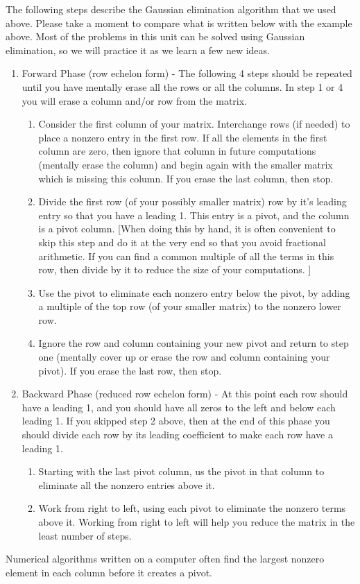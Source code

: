 \documentclass[10pt]{article}
\begin{document}
The following steps describe the Gaussian elimination algorithm that we used above. Please take a moment to compare what is written below with the example above. Most of the problems in this unit can be solved using Gaussian elimination, so we will practice it as we learn a few new ideas.
\begin{enumerate}
\item Forward Phase (row echelon form) - The following 4 steps should be repeated until you have mentally erase all the rows or all the columns. In step 1 or 4 you will erase a column and/or row from the matrix.
\begin{enumerate}
	\item  Consider the first column of your matrix. Interchange rows (if needed) to place a nonzero entry in the first row. If all the elements in the first column are zero, then ignore that column in future computations (mentally erase the column) and begin again with the smaller matrix which is missing this column. If you erase the last column, then stop.
  \item Divide the first row (of your possibly smaller matrix) row by it's leading entry so that you have a leading 1. This entry is a pivot, and the column is a pivot column. [When doing this by hand, it is often convenient to skip this step and do it at the very end so that you avoid fractional arithmetic. If you can find a common multiple of all the terms in this row, then divide by it to reduce the size of your computations.  ] 
	\item Use the pivot to eliminate each nonzero entry below the pivot, by adding a multiple of the top row (of your smaller matrix) to the nonzero lower row.
	\item Ignore the row and column containing your new pivot and return to step one (mentally cover up or erase the row and column containing your pivot). If you erase the last row, then stop.
\end{enumerate}
	\item Backward Phase (reduced row echelon form) - At this point each row should have a leading 1, and you should have all zeros to the left and below each leading 1. If you skipped step 2 above, then at the end of this phase you should divide each row by its leading coefficient to make each row have a leading 1.
\begin{enumerate}
	\item Starting with the last pivot column, us the pivot in that column to eliminate all the nonzero entries above it.
	\item Work from right to left, using each pivot to eliminate the nonzero terms above it. Working from right to left will help you reduce the matrix in the least number of steps.
\end{enumerate}
\end{enumerate}
Numerical algorithms written on a computer often find the largest nonzero element in each column before it creates a pivot.
\end{document}
